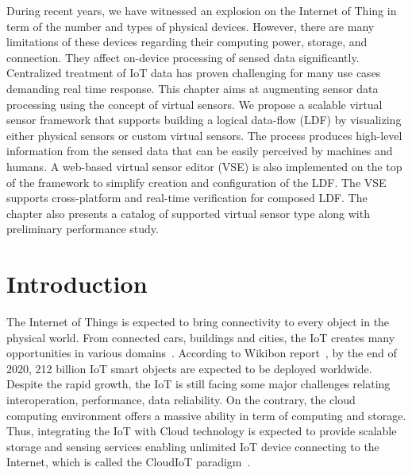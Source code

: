 During recent years, we have witnessed an explosion on the Internet of Thing in term of the number and types of physical devices. However, there are many limitations of these devices regarding their computing power, storage, and connection. They affect on-device processing of sensed data significantly. Centralized treatment of IoT data has proven challenging for many use cases demanding real time response. This chapter aims at augmenting sensor data processing using the concept of virtual sensors. We propose a scalable virtual sensor framework that supports building a logical data-flow (LDF) by visualizing either physical sensors or custom virtual sensors. The process produces high-level information from the sensed data that can be easily perceived by machines and humans. A web-based virtual sensor editor (VSE) is also implemented on the top of the framework to simplify creation and configuration of the LDF. The VSE supports cross-platform and real-time verification for composed LDF. The chapter also presents a catalog of supported virtual sensor type along with preliminary performance study.

\section{Introduction}
The Internet of Things is expected to bring connectivity to every object in the physical world. From connected cars, buildings and cities, the IoT creates many opportunities in various domains~\cite{AlFuqahaGuizaniMohammadiAledhariAyyash2015}. According to Wikibon report~\cite{Floyer2013}, by the end of 2020, 212 billion IoT smart objects are expected to be deployed worldwide. Despite the rapid growth, the IoT is still facing some major challenges relating interoperation, performance, data reliability. On the contrary, the cloud computing environment offers a massive ability in term of computing and storage. Thus, integrating the IoT with Cloud technology is expected to provide scalable storage and sensing services enabling unlimited IoT device connecting to the Internet, which is called the CloudIoT paradigm~\cite{BottaDonatoPersicoPescape2014}.\\

